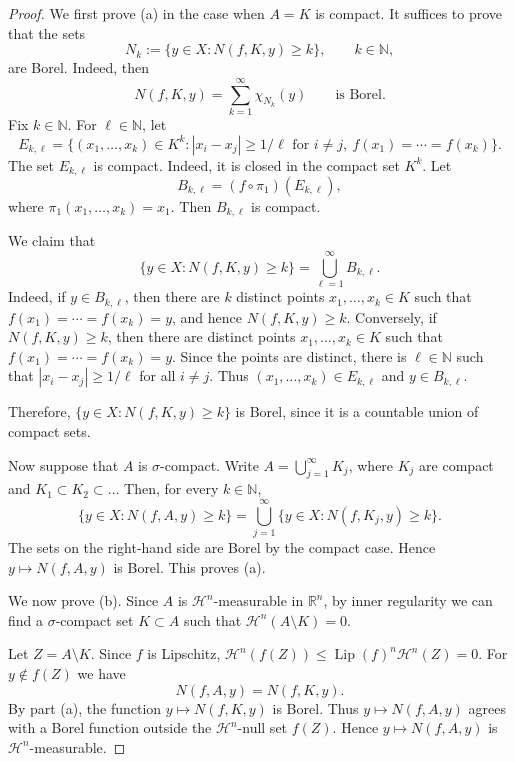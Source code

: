 \documentclass[12pt,leqno]{amsart}
\theoremstyle{definition}
\def\H{{\mathcal H}}
\numberwithin{theorem}{section} \numberwithin{equation}{section}
\begin{document}
\begin{proof}
We first prove (a) in the case when $A=K$ is compact.
It suffices to prove that the sets
\[
N_k:=\{y\in X:N(f,K,y)\geq k\},
\qquad
k\in\mathbb{N},
\]
are Borel. Indeed, then
$$
N(f,K,y)=\sum_{k=1}^\infty  \chi_{N_k}(y)
\qquad
\text{is Borel.}
$$
Fix $k\in\mathbb N$. For $\ell\in\mathbb N$, let
\[
E_{k,\ell}=\{(x_1,\ldots,x_k)\in K^k: |x_i-x_j|\geq 1/\ell
\text{ for } i\neq j,\ f(x_1)=\cdots=f(x_k)\}.
\]
The set $E_{k,\ell}$ is compact. Indeed, it is closed in the compact set $K^k$.
Let
\[
B_{k,\ell}=(f\circ\pi_1)(E_{k,\ell}),
\]
where $\pi_1(x_1,\ldots,x_k)=x_1$. Then $B_{k,\ell}$ is compact.

We claim that
\[
\{y\in X:N(f,K,y)\geq k\}=\bigcup_{\ell=1}^{\infty}B_{k,\ell}.
\]
Indeed, if $y\in B_{k,\ell}$, then there are $k$ distinct points
$x_1,\ldots,x_k\in K$ such that $f(x_1)=\cdots=f(x_k)=y$, and hence
$N(f,K,y)\geq k$. Conversely, if $N(f,K,y)\geq k$, then there are distinct points
$x_1,\ldots,x_k\in K$ such that $f(x_1)=\cdots=f(x_k)=y$. Since the points are
distinct, there is $\ell\in\mathbb N$ such that $|x_i-x_j|\geq 1/\ell$ for all
$i\neq j$. Thus $(x_1,\ldots,x_k)\in E_{k,\ell}$ and $y\in B_{k,\ell}$.

Therefore, $\{y\in X:N(f,K,y)\geq k\}$ is Borel, since it is a countable union of compact sets.


Now suppose that $A$ is $\sigma$-compact. Write
$A=\bigcup_{j=1}^{\infty}K_j$, where $K_j$ are compact and
$K_1\subset K_2\subset\ldots$ Then, for every $k\in\mathbb N$,
\[
\{y\in X:N(f,A,y)\geq k\}
=
\bigcup_{j=1}^{\infty}\{y\in X:N(f,K_j,y)\geq k\}.
\]
The sets on the right-hand side are Borel by the compact case. Hence
$y\mapsto N(f,A,y)$ is Borel. This proves (a).

We now prove (b). Since $A$ is $\mathcal H^n$-measurable in $\mathbb R^n$, by
inner regularity we can find a $\sigma$-compact set $K\subset A$ such that
$\mathcal H^n(A\setminus K)=0$.

Let $Z=A\setminus K$. Since $f$ is Lipschitz,
$\H^n(f(Z))\leq \operatorname{Lip}(f)^n\mathcal H^n(Z)=0$.
For $y\notin f(Z)$ we have
\[
N(f,A,y)=N(f,K,y).
\]
By part (a), the function $y\mapsto N(f,K,y)$ is Borel. Thus
$y\mapsto N(f,A,y)$ agrees with a Borel function outside the
$\mathcal H^n$-null set $f(Z)$. Hence $y\mapsto N(f,A,y)$ is
$\mathcal H^n$-measurable.
\end{proof}
\end{document}
